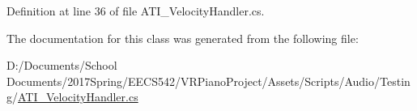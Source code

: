 Definition at line 36 of file A\+T\+I\+\_\+\+Velocity\+Handler.\+cs.



The documentation for this class was generated from the following file\+:\begin{DoxyCompactItemize}
\item 
D\+:/\+Documents/\+School Documents/2017\+Spring/\+E\+E\+C\+S542/\+V\+R\+Piano\+Project/\+Assets/\+Scripts/\+Audio/\+Testing/\hyperlink{_a_t_i___velocity_handler_8cs}{A\+T\+I\+\_\+\+Velocity\+Handler.\+cs}\end{DoxyCompactItemize}

